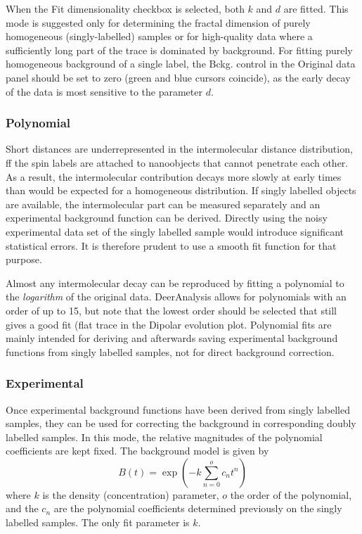 \documentclass{article}
\begin{document}
When the {\ttfamily Fit dimensionality} checkbox is selected, both $k$ and $d$ are fitted. This mode is suggested only for determining the fractal dimension of purely homogeneous (singly-labelled) samples or for high-quality data where a sufficiently long part of the trace is dominated by background. For fitting purely homogeneous background of a single label, the {\ttfamily Bckg.} control in the {\ttfamily Original data} panel should be set to zero (green and blue cursors coincide), as the early decay of the data is most sensitive to the parameter $d$.   

\subsubsection{Polynomial}
Short distances are underrepresented in the intermolecular distance distribution, ff the spin labels are attached to nanoobjects that cannot penetrate each other. As a result, the intermolecular contribution decays more slowly at early times than would be expected for a homogeneous distribution. If singly labelled objects are available, the intermolecular part can be measured separately and an experimental background function can be derived. Directly using the noisy experimental data set of the singly labelled sample would introduce significant statistical errors. It is therefore prudent to use a smooth fit function for that purpose.

Almost any intermolecular decay can be reproduced by fitting a polynomial to the \emph{logarithm} of the original data. DeerAnalysis allows for polynomials with an order of up to 15, but note that the lowest order should be selected that still gives a good fit (flat trace in the {\ttfamily Dipolar evolution} plot. Polynomial fits are mainly intended for deriving and afterwards saving experimental background functions from singly labelled samples, not for direct background correction.

\subsubsection{Experimental}
Once experimental background functions have been derived from singly labelled samples, they can be used for correcting the background in corresponding doubly labelled samples. In this mode, the relative magnitudes of the polynomial coefficients are kept fixed. The background model is given by
\begin{equation}
	B \left( t \right) = \exp \left( -k \sum _{n=0} ^o c_n t^n \right)
\end{equation}
where $k$ is the density (concentration) parameter, $o$ the order of the polynomial, and the $c_n$ are the polynomial coefficients determined previously on the singly labelled samples. The only fit parameter is $k$.
\end{document}
